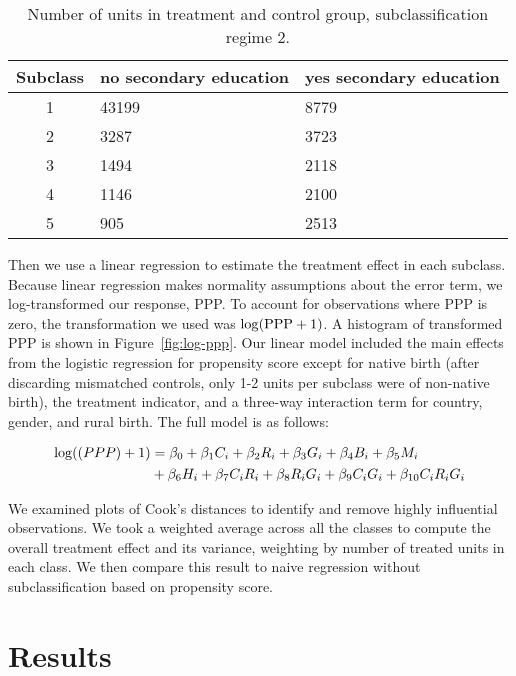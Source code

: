 \documentclass[letterpaper,11pt]{article}
\begin{document}
\begin{table}[htb]
\centering %
\begin{tabular}{cp{2.4cm}p{2.4cm}}
\hline 
Subclass  & no secondary education  & yes secondary education \tabularnewline
\hline 
1  & 43199  & 8779 \tabularnewline
2  & 3287  & 3723 \tabularnewline
3  & 1494  & 2118 \tabularnewline
4  & 1146  & 2100 \tabularnewline
5  & 905  & 2513 \tabularnewline
\hline 
\end{tabular}
\caption{Number of units in treatment and control group, subclassification
regime 2.}
\label{tab:uneven} 
\end{table}


Then we use a linear regression to estimate the treatment effect in each
subclass.  Because linear regression makes normality assumptions about the error
term, we log-transformed our response, PPP. To account for observations where
PPP is zero, the transformation we used was $\log(\textnormal{PPP}+1)$. A
histogram of transformed PPP is shown in Figure~\ref{fig:log-ppp}. Our linear
model included the main effects from the logistic regression for propensity
score except for native birth (after discarding mismatched controls, only 1-2
units per subclass were of non-native birth), the treatment indicator, and a
three-way interaction term for country, gender, and rural birth.  The full model
is as follows:

\begin{equation}
\begin{aligned}
    \log(\textnormal{(}PPP)+1) & =\beta_{0}+\beta_{1}C_{i}+\beta_{2}R_{i}+\beta_{3}G_{i}+\beta_{4}B_{i}+\beta_{5}M_{i}\\
 & +\beta_{6}H_{i}+\beta_{7}C_{i}R_{i}+\beta_{8}R_{i}G_{i}+\beta_{9}C_{i}G_{i}+\beta_{10}C_{i}R_{i}G_{i}
\end{aligned}
\end{equation}


We examined plots of Cook's distances to identify and remove highly influential
observations.  We took a weighted average across all the classes to compute the
overall treatment effect and its variance, weighting by number of treated units
in each class. We then compare this result to naive regression without
subclassification based on propensity score.


\section{Results}
\end{document}
